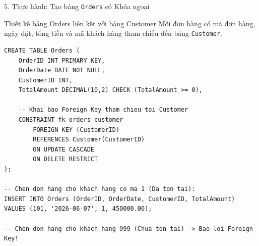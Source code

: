 \documentclass[aspectratio=169,11pt]{beamer}
\begin{document}
\begin{frame}[fragile]{5. Thực hành: Tạo bảng \texttt{Orders} có Khóa ngoại}
\begin{block}{Thiết kế bảng Orders liên kết với bảng Customer}
  Mỗi đơn hàng có mã đơn hàng, ngày đặt, tổng tiền và mã khách hàng tham chiếu đến bảng \texttt{Customer}.
\end{block}

\begin{lstlisting}
CREATE TABLE Orders (
    OrderID INT PRIMARY KEY,
    OrderDate DATE NOT NULL,
    CustomerID INT,
    TotalAmount DECIMAL(10,2) CHECK (TotalAmount >= 0),
    
    -- Khai bao Foreign Key tham chieu toi Customer
    CONSTRAINT fk_orders_customer
        FOREIGN KEY (CustomerID)
        REFERENCES Customer(CustomerID)
        ON UPDATE CASCADE
        ON DELETE RESTRICT
);

-- Chen don hang cho khach hang co ma 1 (Da ton tai):
INSERT INTO Orders (OrderID, OrderDate, CustomerID, TotalAmount)
VALUES (101, '2026-06-07', 1, 450000.00);

-- Chen don hang cho khach hang 999 (Chua ton tai) -> Bao loi Foreign Key!
\end{lstlisting}
\end{frame}

\end{document}
